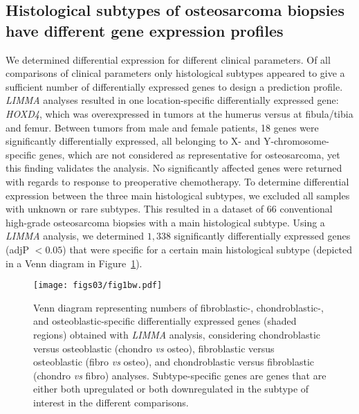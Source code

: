 \subsection{Histological subtypes of osteosarcoma biopsies have different gene expression profiles}
We determined differential expression for different clinical
parameters. Of all comparisons of clinical parameters
only histological subtypes appeared to give a sufficient
number of differentially expressed genes to design a prediction
profile. {\it LIMMA} analyses resulted in one location\hyp{}specific differentially expressed gene: {\it HOXD4},
which was overexpressed in tumors at the humerus versus
at fibula/tibia and femur. Between tumors from
male and female patients, 18 genes were significantly
differentially expressed, all belonging to X- and Y\hyp{}chromosome\hyp{}specific genes, which are not considered as
representative for osteosarcoma, yet this finding validates
the analysis. No significantly affected genes were
returned with regards to response to preoperative chemotherapy.
To determine differential expression
between the three main histological subtypes, we
excluded all samples with unknown or rare subtypes.
This resulted in a dataset of 66 conventional high\hyp{}grade
osteosarcoma biopsies with a main histological subtype.
Using a {\it LIMMA} analysis, we determined $1,338$
significantly differentially expressed genes (adjP $<0.05$)
that were specific for a certain main histological subtype
(depicted in a Venn diagram in Figure~\ref{fig3.1}).%
%
\begin{figure}[htbp]
  \centering
  \begin{minipage}[b]{0.50\linewidth}
    \texttt{[image: figs03/fig1bw.pdf]}		%
  \end{minipage}
    \hfill
  \begin{minipage}[b]{0.46\linewidth}
     \caption{Venn diagram representing numbers of fibroblastic-, \mbox{chondroblastic-,} and osteoblastic\hyp{}specific differentially expressed genes (shaded regions) obtained with {\it LIMMA} analysis, considering chondroblastic versus osteoblastic (chondro {\it vs} osteo), fibroblastic versus osteoblastic (fibro {\it vs} osteo), and chondroblastic versus fibroblastic (chondro {\it vs} fibro) analyses. Subtype\hyp{}specific genes are genes that are either both upregulated or both downregulated in the subtype of interest in the different comparisons.}
     \label{fig3.1}
     \end{minipage}
\end{figure}
